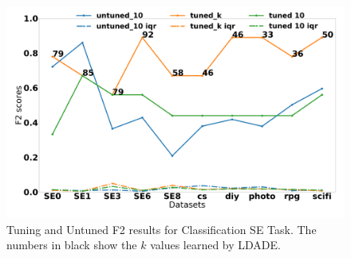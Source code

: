 \documentclass[twocolumn,5p,sort&compress]{elsarticle}
\theoremstyle{break}
\begin{document}
\begin{figure}[!htbp]
  \begin{center}
    \includegraphics[width=\linewidth]{./fig/F2_temp.png}
    \end{center}
  \caption{Tuning and Untuned F2 results for Classification SE Task. The numbers in black show the $k$ values
  learned by LDADE.}\label{fig:classF2}  
\end{figure}
\end{document}
